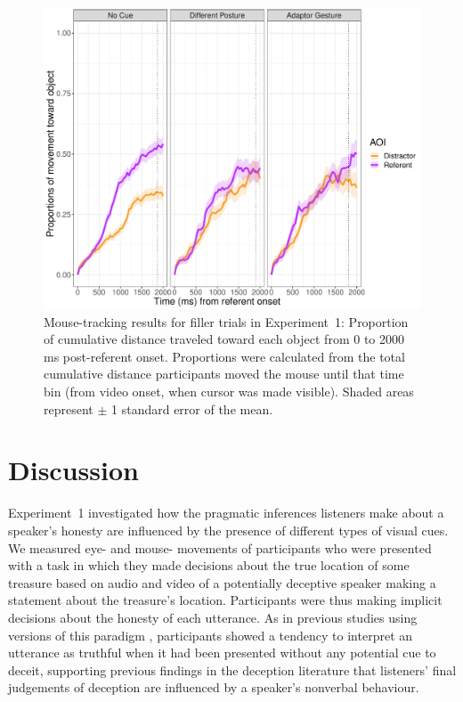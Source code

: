 \documentclass[a4paper,man,natbib]{apa6}
\begin{document}
\begin{figure}[Ht]
  \centering
	\includegraphics[width=\linewidth]{./img/e7_mouse_filler.pdf}
  \caption{Mouse-tracking results for filler trials in Experiment~1: Proportion of cumulative distance traveled toward each object from 0 to 2000 ms post-referent onset. Proportions were calculated from the total cumulative distance participants moved the mouse until that time bin (from video onset, when cursor was made visible). Shaded areas represent $\pm$ 1 standard error of the mean.}
  \label{fig:v1_mouse2}
\end{figure}


\section{Discussion}
Experiment~1 investigated how the pragmatic inferences listeners make about a speaker's honesty are influenced by the presence of different types of visual cues. 
We measured eye- and mouse- movements of participants who were presented with a task in which they made decisions about the true location of some treasure based on audio and video of a potentially deceptive speaker making a statement about the treasure's location.
Participants were thus making implicit decisions about the honesty of each utterance.
As in previous studies using versions of this paradigm \citep{Loy2017, King2018}, participants showed a tendency to interpret an utterance as truthful when it had been presented without any potential cue to deceit, supporting previous findings in the deception literature that listeners' final judgements of deception are influenced by a speaker's nonverbal behaviour.
\end{document}

